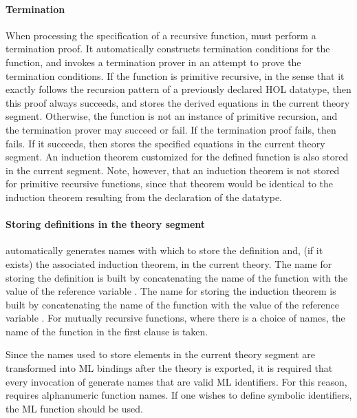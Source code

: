 \paragraph{Termination}

When processing the specification of a recursive function, 
must perform a termination proof. It automatically constructs
termination conditions for the function, and invokes a termination
prover in an attempt to prove the termination conditions.  If the
function is primitive recursive, in the sense that it exactly follows
the recursion pattern of a previously declared HOL datatype, then this
proof always succeeds, and  stores the derived equations in
the current theory segment.
Otherwise, the function is not an
instance of primitive recursion, and the termination prover may
succeed or fail. If the termination proof fails, then  fails.
If it succeeds, then  stores the specified equations in the
current theory segment. An induction theorem customized for the defined
function is also stored in the current segment. Note, however, that an
induction theorem is not stored for primitive recursive functions, since
that theorem would be identical to the induction theorem resulting from
the declaration of the datatype.


\paragraph{Storing definitions in the theory segment}

  automatically generates names with which to store the
definition and, (if it exists) the associated induction theorem, in
the current theory. The name for storing the definition is built by
concatenating the name of the function with the value of the reference
variable . The name for storing the induction theorem
is built by concatenating the name of the function with the value of
the reference variable . For mutually recursive
functions, where there is a choice of names, the name of the function
in the first clause is taken.

 Since the names used to store elements in the current theory segment
are transformed into ML bindings after the theory is exported, it is
required that every invocation of  generate names that are
valid ML identifiers. For this reason,  requires
alphanumeric function names. If one wishes to define symbolic
identifiers, the ML function  should be used.

